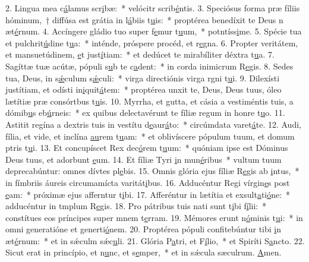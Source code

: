 2. Lingua mea c\uline{á}lamus scr\uline{i}bæ:~* velócitr scrib\uline{é}ntis.
3. Speciósus forma præ fíliis hóminum,~† diffúsa est grátia in l\uline{á}biis t\uline{u}is:~* proptérea benedíxit te Deus n æt\uline{é}rnum.
4. Accíngere gládio tuo super f\uline{e}mur t\uline{u}um,~* potntíss\uline{i}me.
5. Spécie tua et pulchrit\uline{ú}dine t\uline{u}a:~* inténde, próspere procéd, et r\uline{e}gna.
6. Propter veritátem, et mansuetúdinem, \uline{e}t just\uline{í}tiam:~* et dedúcet te mirabíliter déxtra t\uline{u}a.
7. Sagíttæ tuæ acútæ, pópuli s\uline{u}b te c\uline{a}dent:~* in corda inimicrum R\uline{e}gis.
8. Sedes tua, Deus, in s\uline{ǽ}culum s\uline{ǽ}culi:~* virga directiónis virga rgni t\uline{u}i.
9. Dilexísti justítiam, et odísti in\uline{i}quit\uline{á}tem:~* proptérea unxit te, Deus, Deus tuus, óleo lætítiæ præ consórtbus t\uline{u}is.
10. Myrrha, et gutta, et cásia a vestiméntis tuis, a dómib\uline{u}s eb\uline{ú}rneis:~* ex quibus delectavérunt te fíliæ regum in honre t\uline{u}o.
11. Astitit regína a dextris tuis in vestítu d\uline{e}aur\uline{á}to:~* circúmdata varet\uline{á}te.
12. Audi, fília, et vide, et inclína \uline{au}rem t\uline{u}am:~* et oblivíscere pópulum tuum, et domum ptris t\uline{u}i.
13. Et concupíscet Rex dec\uline{ó}rem t\uline{u}um:~* quóniam ipse est Dóminus Deus tuus, et adorbunt \uline{e}um.
14. Et fíliæ Tyri \uline{i}n mun\uline{é}ribus~* vultum tuum deprecabúntur: omnes dívtes pl\uline{e}bis.
15. Omnis glória ejus fíliæ R\uline{e}gis ab \uline{i}ntus,~* in fímbriis áureis circumamícta varitát\uline{i}bus.
16. Adducéntur Regi vírgin\uline{e}s post \uline{e}am:~* próximæ ejus afferntur t\uline{i}bi.
17. Afferéntur in lætítia et exsult\uline{a}ti\uline{ó}ne:~* adducéntur in tmplum R\uline{e}gis.
18. Pro pátribus tuis nati sunt t\uline{i}bi f\uline{í}lii:~* constítues eos príncipes super mnem t\uline{e}rram.
19. Mémores erunt n\uline{ó}minis t\uline{u}i:~* in omni generatióne et generti\uline{ó}nem.
20. Proptérea pópuli confitebúntur tibi \uline{i}n æt\uline{é}rnum:~* et in sǽculm sǽc\uline{u}li.
21. Glória P\uline{a}tri, et F\uline{í}lio,~* et Spiríti S\uline{a}ncto.
22. Sicut erat in princípio, et n\uline{u}nc, et s\uline{e}mper,~* et in sǽcula sæculrum. \uline{A}men.
